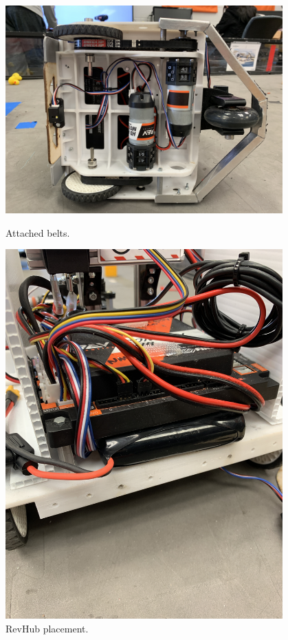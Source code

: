 \begin{figure}[ht]
\centering
\begin{minipage}[b]{.48\textwidth}
  \centering
  \includegraphics[width=0.95\textwidth]{Meetings/October/10-29-21/10-29-21_Hardware_Figure1 - Nathan Forrer.JPG}
  \caption{Attached belts.}
  \label{fig:pic7}
\end{minipage}%
\hfill%
\begin{minipage}[b]{.48\textwidth}
  \centering
  \includegraphics[width=0.95\textwidth]{Meetings/October/10-29-21/10-29-21_Hardware_Figure2 - Nathan Forrer.JPG}
  \caption{RevHub placement.}
  \label{fig:pic4}
\end{minipage}
\end{figure}

